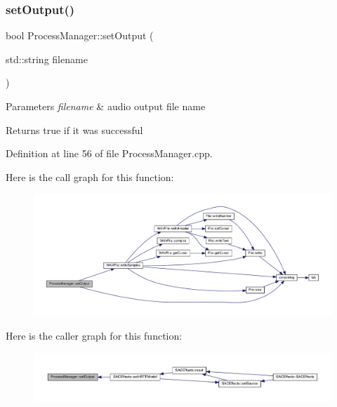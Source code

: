 \subsubsection{\texorpdfstring{set\+Output()}{setOutput()}}
{\footnotesize\ttfamily bool Process\+Manager\+::set\+Output (\begin{DoxyParamCaption}\item[{std\+::string}]{filename }\end{DoxyParamCaption})}


\begin{DoxyParams}{Parameters}
{\em filename} & audio output file name \\
\hline
\end{DoxyParams}
\begin{DoxyReturn}{Returns}
true if it was successful 
\end{DoxyReturn}


Definition at line 56 of file Process\+Manager.\+cpp.

Here is the call graph for this function\+:
\nopagebreak
\begin{figure}[H]
\begin{center}
\leavevmode
\includegraphics[width=350pt]{class_process_manager_aa2deb4f60f83a490ed7520d2ce926626_cgraph}
\end{center}
\end{figure}
Here is the caller graph for this function\+:
\nopagebreak
\begin{figure}[H]
\begin{center}
\leavevmode
\includegraphics[width=350pt]{class_process_manager_aa2deb4f60f83a490ed7520d2ce926626_icgraph}
\end{center}
\end{figure}


